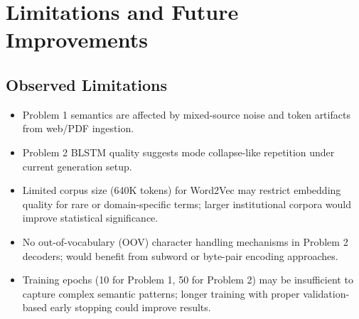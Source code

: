 \documentclass[11pt,a4paper]{article}
\begin{document}

\section{Limitations and Future Improvements}

\subsection{Observed Limitations}
\begin{itemize}[leftmargin=1.5em]
    \item Problem 1 semantics are affected by mixed-source noise and token artifacts from web/PDF ingestion.
    \item Problem 2 BLSTM quality suggests mode collapse-like repetition under current generation setup.

    \item Limited corpus size (640K tokens) for Word2Vec may restrict embedding quality for rare or domain-specific terms; larger institutional corpora would improve statistical significance.

    \item No out-of-vocabulary (OOV) character handling mechanisms in Problem 2 decoders; would benefit from subword or byte-pair encoding approaches.

    \item Training epochs (10 for Problem 1, 50 for Problem 2) may be insufficient to capture complex semantic patterns; longer training with proper validation-based early stopping could improve results.
\end{itemize}
\end{document}
